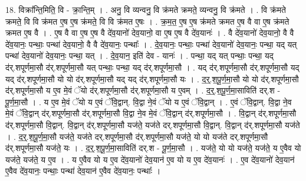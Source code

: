 \documentclass[17pt]{extarticle}
\begin{document}
18. विक्रा᳚न्ति॒मिति॒ वि - क्रा॒न्ति॒म् । . अनु॒ वि व्यन्वनु॒ वि क्र॑मते क्रमते॒ व्यन्वनु॒ वि क्र॑मते । . वि क्र॑मते क्रमते॒ वि वि क्र॑मत ए॒ष ए॒ष क्र॑मते॒ वि वि क्र॑मत ए॒षः । . क्र॒म॒त॒ ए॒ष ए॒ष क्र॑मते क्रमत ए॒ष वै वा ए॒ष क्र॑मते क्रमत ए॒ष वै । . ए॒ष वै वा ए॒ष ए॒ष वै दे॑व॒यानो॑ देव॒यानो॒ वा ए॒ष ए॒ष वै दे॑व॒यानः॑ । . वै दे॑व॒यानो॑ देव॒यानो॒ वै वै दे॑व॒यानः॒ पन्थाः॒ पन्था॑ देव॒यानो॒ वै वै दे॑व॒यानः॒ पन्थाः᳚ । . दे॒व॒यानः॒ पन्थाः॒ पन्था॑ देव॒यानो॑ देव॒यानः॒ पन्था॒ यद् यत् पन्था॑ देव॒यानो॑ देव॒यानः॒ पन्था॒ यत् । . दे॒व॒यान॒ इति॑ देव - यानः॑ । . पन्था॒ यद् यत् पन्थाः॒ पन्था॒ यद् द॑र्.शपूर्णमा॒सौ द॑र्.शपूर्णमा॒सौ यत् पन्थाः॒ पन्था॒ यद् द॑र्.शपूर्णमा॒सौ । . यद् द॑र्.शपूर्णमा॒सौ द॑र्.शपूर्णमा॒सौ यद् यद् द॑र्.शपूर्णमा॒सौ यो यो द॑र्.शपूर्णमा॒सौ यद् यद् द॑र्.शपूर्णमा॒सौ यः । . द॒र्॒.श॒पू॒र्ण॒मा॒सौ यो यो द॑र्.शपूर्णमा॒सौ द॑र्.शपूर्णमा॒सौ य ए॒व मे॒वं ॅयो द॑र्.शपूर्णमा॒सौ द॑र्.शपूर्णमा॒सौ य ए॒वम् । . द॒र्॒.श॒पू॒र्ण॒मा॒साविति॑ दर्.श - पू॒र्ण॒मा॒सौ । . य ए॒व मे॒वं ॅयो य ए॒वं ॅवि॒द्वान्. वि॒द्वा ने॒वं ॅयो य ए॒वं ॅवि॒द्वान् । . ए॒वं ॅवि॒द्वान्. वि॒द्वा ने॒व मे॒वं ॅवि॒द्वान् द॑र्.शपूर्णमा॒सौ द॑र्.शपूर्णमा॒सौ वि॒द्वा ने॒व मे॒वं ॅवि॒द्वान् द॑र्.शपूर्णमा॒सौ । . वि॒द्वान् द॑र्.शपूर्णमा॒सौ द॑र्.शपूर्णमा॒सौ वि॒द्वान्. वि॒द्वान् द॑र्.शपूर्णमा॒सौ यज॑ते॒ यज॑ते दर्.शपूर्णमा॒सौ वि॒द्वान्. वि॒द्वान् द॑र्.शपूर्णमा॒सौ यज॑ते । . द॒र्॒.श॒पू॒र्ण॒मा॒सौ यज॑ते॒ यज॑ते दर्.शपूर्णमा॒सौ द॑र्.शपूर्णमा॒सौ यज॑ते॒ यो यो यज॑ते दर्.शपूर्णमा॒सौ द॑र्.शपूर्णमा॒सौ यज॑ते॒ यः । . द॒र्॒.श॒पू॒र्ण॒मा॒साविति॑ दर्.श - पू॒र्ण॒मा॒सौ । . यज॑ते॒ यो यो यज॑ते॒ यज॑ते॒ य ए॒वैव यो यज॑ते॒ यज॑ते॒ य ए॒व । . य ए॒वैव यो य ए॒व दे॑व॒यानो॑ देव॒यान॑ ए॒व यो य ए॒व दे॑व॒यानः॑ । . ए॒व दे॑व॒यानो॑ देव॒यान॑ ए॒वैव दे॑व॒यानः॒ पन्थाः॒ पन्था॑ देव॒यान॑ ए॒वैव दे॑व॒यानः॒ पन्थाः᳚ । \newline
\end{document}
